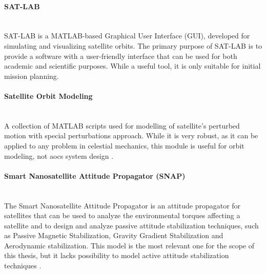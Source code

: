         \paragraph*{SAT-LAB}\hspace{0pt}\\
            SAT-LAB is a MATLAB-based Graphical User Interface (GUI), developed for simulating and visualizing satellite orbits. The primary purpose of SAT-LAB is to provide a software with a user-friendly interface that can be used for both academic and scientific purposes. While a useful tool, it is only suitable for initial mission planning.\cite{satlab}

        \paragraph*{Satellite Orbit Modeling}\hspace{0pt}\\
            A collection of MATLAB scripts used for modelling of satellite's perturbed motion with special perturbations approach. While it is very robust, as it can be applied to any problem in celestial mechanics, this module is useful for orbit modeling, not \ac{aocs} system design \cite{som-matlab}.
            
        \paragraph*{Smart Nanosatellite Attitude Propagator (SNAP)}\hspace{0pt}\\
            The Smart Nanosatellite Attitude Propagator is an attitude propagator for satellites that can be used to analyze the environmental torques affecting a satellite and to design and analyze passive attitude stabilization techniques, such as Passive Magnetic Stabilization, Gravity Gradient Stabilization and Aerodynamic stabilization. This model is the most relevant one for the scope of this thesis, but it lacks possibility to model active attitude stabilization techniques \cite{snap}.


